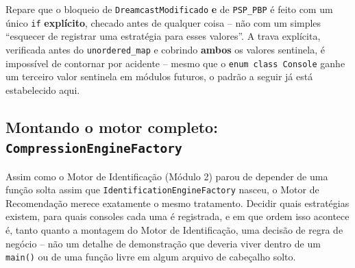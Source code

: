 \begin{CaixaAlerta}
Repare que o bloqueio de \texttt{DreamcastModificado} \textbf{e} de \texttt{PSP\_PBP} é feito com um único \texttt{if} \textbf{explícito}, checado antes de qualquer coisa -- não com um simples ``esquecer de registrar uma estratégia para esses valores''. A trava explícita, verificada antes do \texttt{unordered\_map} e cobrindo \textbf{ambos} os valores sentinela, é impossível de contornar por acidente -- mesmo que o \texttt{enum class Console} ganhe um terceiro valor sentinela em módulos futuros, o padrão a seguir já está estabelecido aqui.
\end{CaixaAlerta}

\subsection{Montando o motor completo: \texttt{CompressionEngineFactory}}
\label{sec:compression-engine-factory}

Assim como o Motor de Identificação (Módulo 2) parou de depender de uma função solta assim que \texttt{IdentificationEngineFactory} nasceu, o Motor de Recomendação merece exatamente o mesmo tratamento. Decidir quais estratégias existem, para quais consoles cada uma é registrada, e em que ordem isso acontece é, tanto quanto a montagem do Motor de Identificação, uma decisão de regra de negócio -- não um detalhe de demonstração que deveria viver dentro de um \texttt{main()} ou de uma função livre em algum arquivo de cabeçalho solto.

